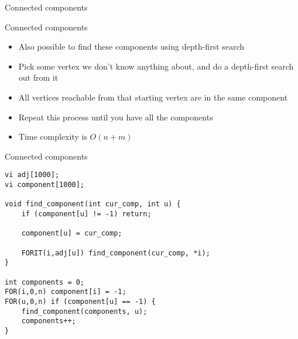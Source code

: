 \documentclass[12pt,t]{beamer}
\newcommand{\bi}{\begin{itemize}}
\newcommand{\ei}{\end{itemize}}
\begin{document}
\begin{frame}{Connected components}
\end{frame}

\begin{frame}{Connected components}
    \vspace{30pt}
    \bi
        \item Also possible to find these components using depth-first search
        \item Pick some vertex we don't know anything about, and do a depth-first search out from it
        \item All vertices reachable from that starting vertex are in the same component
        \item Repeat this process until you have all the components
        \item Time complexity is $O(n + m)$
    \ei
\end{frame}

\begin{frame}[fragile]{Connected components}
    \begin{verbatim}
vi adj[1000];
vi component[1000];

void find_component(int cur_comp, int u) {
    if (component[u] != -1) return;

    component[u] = cur_comp;

    FORIT(i,adj[u]) find_component(cur_comp, *i);
}

int components = 0;
FOR(i,0,n) component[i] = -1;
FOR(u,0,n) if (component[u] == -1) {
    find_component(components, u);
    components++;
}
    \end{verbatim}
\end{frame}
\end{document}
